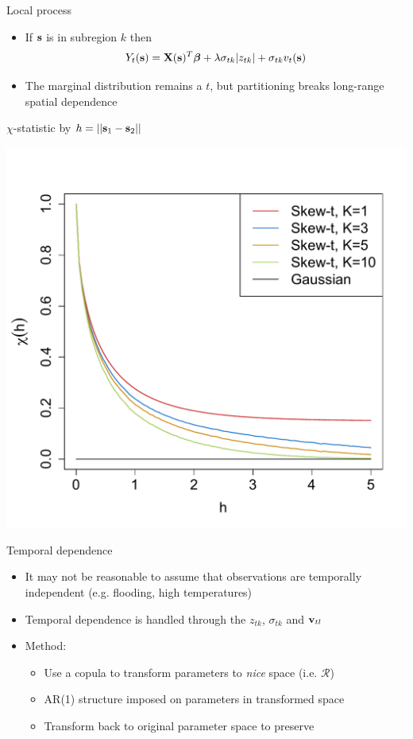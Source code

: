 \documentclass{beamer}
\begin{document}
\begin{frame}{Local \skewt{} process}
	\begin{itemize}\setlength{\itemsep}{1em}
		\item If $\mathbf{s}$ is in subregion $k$ then $$Y_t(\mathbf{s}) = \mathbf{X}(\mathbf{s})^T\mbox{\boldmath $\beta$} +\lambda\sigma_{tk}|z_{tk}| + \sigma_{tk}v_t(\mathbf{s})\nonumber$$
		\item The marginal distribution remains a $t$, but partitioning breaks long-range spatial dependence
	\end{itemize}
\end{frame}

 \begin{frame}{$\chi$-statistic by $h=||\mathbf{s}_1-\mathbf{s}_2||$}
 	\begin{center}
 		\includegraphics[height=0.8\textheight]{plots/chi-h}
 	\end{center}
 \end{frame}

 \begin{frame}{Temporal dependence}
 	\begin{itemize}\setlength\itemsep{1em}
 	\item It may not be reasonable to assume that observations are temporally independent (e.g. flooding, high temperatures)
 	\item Temporal dependence is handled through the $z_{tk}$, $\sigma_{tk}$ and $\mathbf{v}_{tl}$
 	\item Method: \vspace{0.5em}
 	\begin{itemize}\setlength\itemsep{0.5em}
 	\item Use a copula to transform parameters to \emph{nice} space (i.e. $\mathcal{R}$)
 	\item AR(1) structure imposed on parameters in transformed space
 	\item Transform back to original parameter space to preserve \skewt{}
 	\end{itemize}
 	\end{itemize}
 \end{frame}
\end{document}

